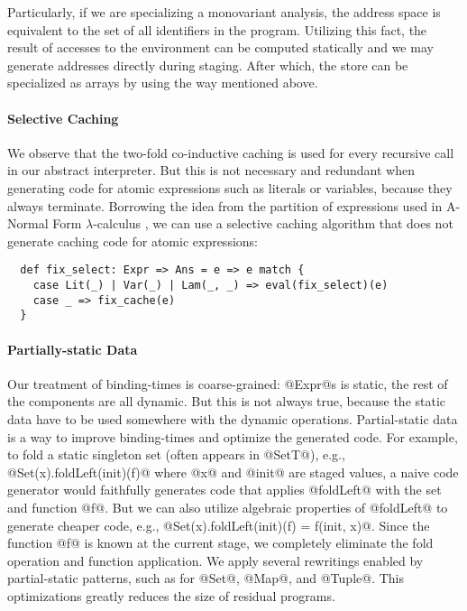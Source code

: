Particularly, if we are specializing a monovariant analysis, the address space
is equivalent to the set of all identifiers in the program. Utilizing this fact, the
result of accesses to the environment can be computed statically and we may
generate addresses directly during staging. After which, the store can be
specialized as arrays by using the way mentioned above.

\paragraph{Selective Caching} We observe that the two-fold co-inductive
caching is used for every recursive call in our abstract interpreter. But this
is not necessary and redundant when generating code for atomic
expressions such as literals or variables, because they always terminate.
Borrowing the idea from the partition of expressions used in A-Normal Form
$\lambda$-calculus \cite{Flanagan:1993:ECC:155090.155113}, we can use a
selective caching algorithm that does not generate caching code for atomic
expressions:
\begin{lstlisting}
  def fix_select: Expr => Ans = e => e match {
    case Lit(_) | Var(_) | Lam(_, _) => eval(fix_select)(e)
    case _ => fix_cache(e)
  }
\end{lstlisting}

\paragraph{Partially-static Data}
Our treatment of binding-times is coarse-grained: @Expr@s is static, the rest
of the components are all dynamic. But this is not always true, because the
static data have to be used somewhere with the dynamic operations.
Partial-static data is a way to improve binding-times and optimize the
generated code.
For example, to fold a static singleton set (often appears in @SetT@), e.g.,
@Set(x).foldLeft(init)(f)@ where @x@ and @init@ are staged values, a naive code
generator would faithfully generates code that applies @foldLeft@ with the set
and function @f@. But we can also utilize algebraic properties of @foldLeft@
to generate cheaper code, e.g., @Set(x).foldLeft(init)(f) = f(init, x)@. Since the
function @f@ is known at the current stage, we completely eliminate the fold
operation and function application. We apply several rewritings enabled by
partial-static patterns, such as for @Set@, @Map@, and @Tuple@. This
optimizations greatly reduces the size of residual programs.

